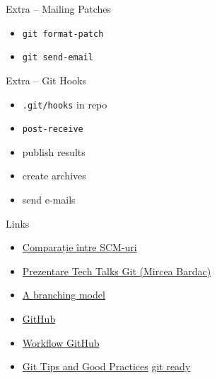 \documentclass{beamer}
\begin{document}
\begin{frame}{Extra -- Mailing Patches}
  \begin{itemize}
    \item \texttt{git format-patch}
    \item \texttt{git send-email}
  \end{itemize}
\end{frame}

\begin{frame}{Extra -- Git Hooks}
  \begin{itemize}
    \item \texttt{.git/hooks} in repo
    \item \texttt{post-receive}
    \item publish results
    \item create archives
    \item send e-mails
  \end{itemize}
\end{frame}

\begin{frame}[label=l]{Links}
  \begin{itemize}
    \item \href{http://en.wikipedia.org/wiki/Comparison_of_revision_control_software}{Comparație între SCM-uri}
    \item \href{http://talks.rosedu.org/prezentari/prezentarea03}{Prezentare
    Tech Talks Git (Mircea Bardac)}
    \item \href{http://nvie.com/posts/a-successful-git-branching-model/}{A
    branching model}
    \item \href{http://github.com}{GitHub}
    \item
    \href{http://www.eqqon.com/index.php/Collaborative_Github_Workflow}{Workflow
    GitHub}
    \item
    \href{http://techblog.rosedu.org/git-good-practices.html}{Git Tips and
    Good Practices}
    \href{http://gitready.com/}{git ready}
  \end{itemize}
\end{frame}
\end{document}
